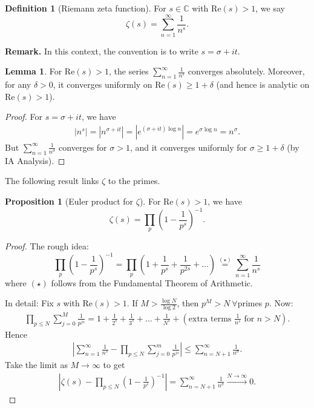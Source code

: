 \documentclass{article}
\theoremstyle{definition}
\newtheorem{lemma}[theorem]{Lemma}
\newtheorem{prop}[theorem]{Proposition}
\newtheorem{defn}{Definition}[section]
\begin{document}
\begin{defn}[Riemann zeta function]
    For $s \in \mathbb{C}$ with $\text{Re}(s)>1$, we say $$\zeta(s) = \sum_{n=1}^{\infty} \frac{1}{n^s}.$$
\end{defn}
\textbf{Remark.} In this context, the convention is to write $s = \sigma + it$.
\begin{lemma}
    For $\text{Re}(s)>1$, the series $\sum_{n=1}^{\infty} \frac{1}{n^s}$ converges absolutely. Moreover, for any $\delta>0$, it converges uniformly on $\text{Re}(s)\ge 1+\delta$ (and hence is analytic on $\text{Re}(s)>1$).    
\end{lemma}
\begin{proof}
    For $s = \sigma + it$, we have 
    \begin{align*}
        |n^s| = |n^{\sigma + it}| = |e^{(\sigma+it)\log n}| = e^{\sigma \log n} = n^\sigma.
    \end{align*}
    But $\sum_{n=1}^{\infty} \frac{1}{n^\sigma}$ converges for $\sigma>1$, and it converges uniformly for $\sigma \ge 1 + \delta$ (by IA Analysis).
\end{proof}
The following result links $\zeta$ to the primes.
\begin{prop}[Euler product for $\zeta$]
    For $\text{Re}(s)>1$, we have \[
    \zeta(s) = \prod_{p}^{} \left(1-\frac{1}{p^s}\right)^{-1}. 
    \]
\end{prop}
\begin{proof}
    The rough idea:
    \[
    \prod_{p}^{} \left(1-\frac{1}{p^s}\right)^{-1} = \prod_{p}^{} \left(1+\frac{1}{p^s}+\frac{1}{p^{2s}}+\ldots \right) \stackrel{(\star)}{=} \sum_{n=1}^{\infty} \frac{1}{n^s}
    \] where $(\star)$ follows from the Fundamental Theorem of Arithmetic.
    \vspace{1mm}
    
    In detail: Fix $s$ with $\text{Re}(s)>1$. If $M>\frac{\log N}{\log 2}$, then $p^M > N ~\forall $primes $p$. Now:
    \begin{align*}
        \prod_{p\le N}^{} \sum_{j=0}^{M} \frac{1}{p^{js}} = 1+ \frac{1}{2^s} + \frac{1}{3^s} + \ldots + \frac{1}{N^s} + \left(\text{extra terms }\frac{1}{n^s} \text{ for }n>N \right).
    \end{align*}
    Hence
    \begin{align*}
        \left|\sum_{n=1}^{\infty} \frac{1}{n^s} - \prod_{p\le N}^{} \sum_{j=0}^{m} \frac{1}{p^{js}} \right| \le \sum_{n=N+1}^{\infty} \frac{1}{n^\sigma}.
    \end{align*}
    Take the limit as $M \to \infty$ to get 
    \begin{align*}
        \left|\zeta(s)- \prod_{p\le N}^{} \left(1-\frac{1}{p^s}\right)^{-1}\right| = \sum_{n=N+1}^{\infty} \frac{1}{n^{\sigma}} \stackrel{N \to \infty}{\to} 0.
    \end{align*}
\end{proof}
\end{document}
